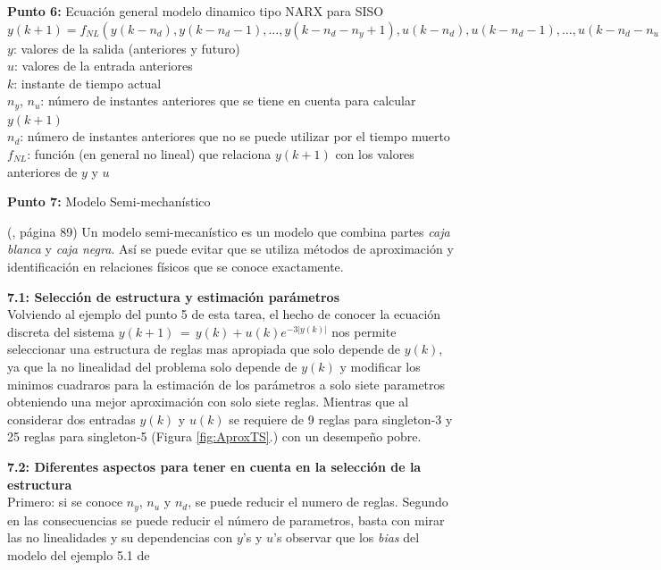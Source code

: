 \documentclass[10pt,onecolumn,twoside,letterpaper]{article}
\newcommand{\myreferences}{../../bib/library}
\begin{document}
\par{\bf \large Punto 6:} Ecuaci\'on general modelo dinamico tipo NARX para SISO\\
$y(k+1)=f_{NL}(y(k-n_d),y(k-n_d-1),\dots,y(k-n_d-n_y+1),u(k-n_d),u(k-n_d-1),\dots,u(k-n_d-n_u+1))$\\
$y$: valores de la salida (anteriores y futuro)\\
$u$: valores de la entrada anteriores\\
$k$: instante de tiempo actual\\
$n_y$, $n_u$: número de instantes anteriores que se tiene en cuenta para calcular $y(k+1)$\\
$n_d$: número de instantes anteriores que no se puede utilizar por el tiempo muerto\\
$f_{NL}$: función (en general no lineal) que relaciona $y(k+1)$ con los valores anteriores de $y$ y $u$\\

\par{\bf \large Punto 7:} Modelo Semi-mechan\'istico\\
\par(\cite{Babuska1999}, página 89) Un modelo semi-mecanístico es un modelo que combina partes \emph{caja blanca} y \emph{caja negra}. Así se puede evitar que se utiliza métodos de aproximación y identificación en relaciones físicos que se conoce exactamente.
\par{\bf 7.1: Selecci\'on de estructura y estimaci\'on par\'ametros}\\
Volviendo al ejemplo del punto 5 de esta tarea, el hecho de conocer la ecuaci\'on discreta del sistema $y(k+1)\,=\,y(k)+u(k)e^{-3\left|y(k)\right|}$ nos permite seleccionar una estructura de reglas mas apropiada que solo depende de $y(k)$, ya que la no linealidad del problema solo depende de $y(k)$ y modificar los minimos cuadraros para la estimaci\'on de los par\'ametros a solo siete parametros obteniendo una mejor aproximaci\'on con solo siete reglas. Mientras que al considerar dos entradas $y(k)$ y $u(k)$ se requiere de 9 reglas para singleton-3 y 25 reglas para singleton-5 (Figura \ref{fig:AproxTS}.) con un desempeño pobre.
\par{\bf 7.2: Diferentes aspectos para tener en cuenta en la selecci\'on de la estructura}\\
Primero: si se conoce $n_y$, $n_u$ y $n_d$, se puede reducir el numero de reglas. Segundo en las consecuencias se puede reducir el n\'umero de parametros, basta con mirar las no linealidades y su dependencias con $y$'s y $u$'s observar que los \emph{bias} del modelo del ejemplo 5.1 de \cite{Babuska1999}



\end{document}
